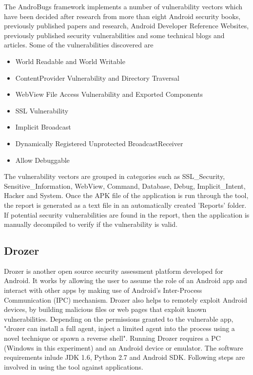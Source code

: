 \documentclass{mproj}
\begin{document}
The AndroBugs framework implements a number of vulnerability vectors which have been decided after research from more than eight Android security books, previously published papers and research, Android Developer Reference Websites, previously published security vulnerabilities and some technical blogs and articles\cite{}. Some of the vulnerabilities discovered are 
\begin{itemize}
\item World Readable and World Writable
\item ContentProvider Vulnerability and Directory Traversal
\item WebView File Access Vulnerability and Exported Components
\item SSL Vulnerability
\item Implicit Broadcast
\item Dynamically Registered Unprotected BroadcastReceiver
\item Allow Debuggable
\end{itemize}

The vulnerability vectors are grouped in categories such as SSL\_Security, Sensitive\_Information, WebView, Command, Database, Debug, Implicit\_Intent, Hacker and System. Once the APK file of the application is run through the tool, the report is generated as a text file in an automatically created 'Reports' folder. If potential security vulnerabilities are found in the report, then the application is manually decompiled to verify if the vulnerability is valid. 

\subsection{Drozer}

Drozer is another open source security assessment platform developed for Android. It works by allowing the user to assume the role of an Android app and interact with other apps by making use of Android’s Inter-Process Communication (IPC) mechanism. Drozer also helps to remotely exploit Android devices, by building malicious files or web pages that exploit known vulnerabilities. Depending on the permissions granted to the vulnerable app, "drozer can install a full agent, inject a limited agent into the process using a novel technique or spawn a reverse shell"\cite{}. Running Drozer requires a PC (Windows in this experiment) and an Android device or emulator. The software requirements inlude JDK 1.6, Python 2.7 and Android SDK. Following steps are involved in using the tool against applications.
\end{document}
